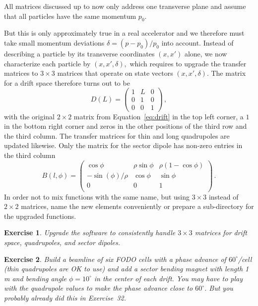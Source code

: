 \documentclass{article}
\newtheorem{exercise}{Exercise}
\begin{document}
All matrices discussed up to now only address one transverse plane and assume that all
particles have the same momentum $p_0$. 
\par
But this is only approximately true in a real 
accelerator and we therefore must take small momentum deviations $\delta = (p-p_0)/p_0$
into account. Instead of describing a particle by its transverse coordinates $(x,x')$
alone, we now characterize each particle by $(x,x',\delta),$ which requires to upgrade
the transfer matrices to $3\times 3$ matrices that operate on state vectors $(x,x',\delta).$
The matrix for a drift space therefore turns out to be
\begin{equation}
D(L)=\left(\begin{array}{ccc} 1 &L & 0\\ 0 & 1 & 0 \\ 0 & 0 & 1\end{array}\right)\, ,
\end{equation} 
with the original $2\times2$ matrix from Equation~\ref{eq:drift} in the top left corner,
a $1$ in the bottom right corner and zeros in the other positions of the third row and
the third column. The transfer matrices for thin and long quadrupoles are updated likewise.
Only the matrix for the sector dipole has non-zero entries in the third column
\begin{equation}
B(l,\phi)=
\left(\begin{array}{ccc}
\cos\phi & \rho\sin\phi      & \rho(1-\cos\phi) \\
-\sin(\phi)/\rho & \cos\phi  & \sin\phi \\
        0        &    0      & 1  \\
\end{array}\right)\, .
\end{equation}
In order not to mix functions with the same name, but using $3\times3$ instead of 
$2\times 2$ matrices, name the new elements conveniently or prepare a sub-directory for the upgraded functions.
\begin{exercise}
Upgrade the software to consistently handle $3\times3$ matrices for drift space, quadrupoles, and sector dipoles.
\end{exercise}
  
\begin{exercise}
Build a beamline of six FODO cells with a phase advance of $60^\circ$/cell (thin quadrupoles are OK to use) and add a sector bending magnet with length 1 m and bending angle $\phi=10^\circ$ in the center of each drift. You may have to play with the quadrupole values to make the phase advance close to $60^\circ$. But you probably already did this in Exercise~32.
\end{exercise}
  
\end{document}
